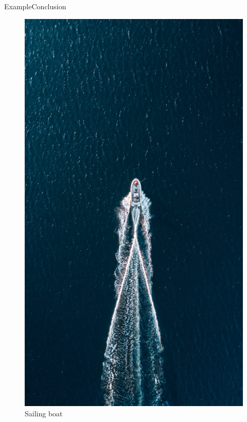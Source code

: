 \documentclass[9pt, xcolor={usenames, dvipsnames}]{beamer}
\begin{document}
\begin{frame}{Example}{Conclusion}
\begin{minipage}[c]{0.3\textwidth}
\begin{figure}
						\includegraphics[width=\textwidth]{images/boat_end.jpg}
						\caption{Sailing boat}
					\end{figure}
				\end{minipage}
			\end{frame}
\end{document}

